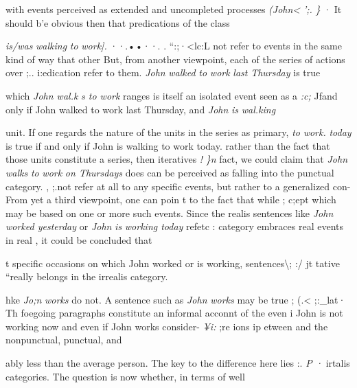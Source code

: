 with events perceived as extended and uncompleted processes \textit{(John{\textless}} \textit{'}\textit{;}\textit{.} \textit{\} }· It should b'e obvious then that predications of the  class

\textit{is/was} \textit{walki}\textit{n}\textit{g} \textit{to} \textit{wor}\textit{k}\textit{]. }··.••··. . ``:;·{\textless}lc:L not refer to events in the same kind of way that other  But, from another viewpoint, each of the series of actions over ;.. i:edication refer to them. \textit{John} \textit{walked} \textit{to} \textit{work} \textit{last} \textit{Thursday} is true

which \textit{John wal.k} \textit{s to work }ranges is itself an isolated event seen as a \textit{:}\textit{c}\textit{;} Jfand only if John walked to work last Thursday, and \textit{John} \textit{is} \textit{wal.king}

unit. If one regards the nature of the units in the series as primary, \textit{to} \textit{work.} \textit{today} is true if and only if John is walking to work today. rather than the fact that those units constitute a series, then iteratives \textit{!} \textit{\}n} fact, we could claim that \textit{John} \textit{walks} \textit{to} \textit{work} \textit{on Thurs}\textit{d}\textit{ays} does can be perceived as falling into the punctual category. , ;.not refer at all to any specific events, but rather to a generalized con- From yet a third viewpoint, one can poin t to the fact that while ; c;ept which may be based on one or more such events. Since the realis sentences like \textit{John worked yesterday }or \textit{John} \textit{is} \textit{working today} refetc : category embraces real events in real , it could be concluded that

t specific occasions on which John worked or is working, sentences{\textbackslash}; :/ jt tative ``really belongs in the irrealis category.

hke \textit{J}\textit{o}\textit{;}\textit{n} \textit{works} do not. A sentence such as \textit{John} \textit{wor}\textit{k}\textit{s} may be true ; (.{\textless} ;:\_lat· Th foegoing paragraphs constitute an informal acconnt of the even i John is not working now and even if John works consider- \textit{¥}\textit{i}\textit{:} ;re ions ip etween  and the nonpunctual, punctual, and

ably less than the average person. The key to the difference here lies :. \textit{P} \textit{·}  irtalis categories. The question is now whether, in terms of well\-

